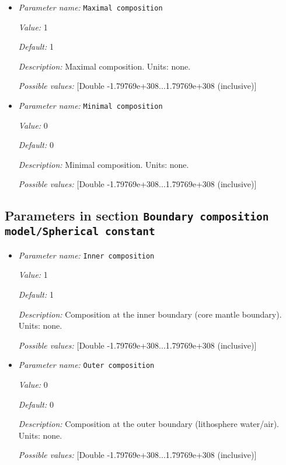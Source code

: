 \begin{itemize}
\item {\it Parameter name:} {\tt Maximal composition}
\label{parameters:Boundary composition model/Initial composition/Maximal composition}


{\it Value:} 1


{\it Default:} 1


{\it Description:} Maximal composition. Units: none.


{\it Possible values:} [Double -1.79769e+308...1.79769e+308 (inclusive)]
\item {\it Parameter name:} {\tt Minimal composition}
\label{parameters:Boundary composition model/Initial composition/Minimal composition}


{\it Value:} 0


{\it Default:} 0


{\it Description:} Minimal composition. Units: none.


{\it Possible values:} [Double -1.79769e+308...1.79769e+308 (inclusive)]
\end{itemize}

\subsection{Parameters in section \tt Boundary composition model/Spherical constant}
\label{parameters:Boundary_20composition_20model/Spherical_20constant}

\begin{itemize}
\item {\it Parameter name:} {\tt Inner composition}
\label{parameters:Boundary composition model/Spherical constant/Inner composition}


{\it Value:} 1


{\it Default:} 1


{\it Description:} Composition at the inner boundary (core mantle boundary). Units: none.


{\it Possible values:} [Double -1.79769e+308...1.79769e+308 (inclusive)]
\item {\it Parameter name:} {\tt Outer composition}
\label{parameters:Boundary composition model/Spherical constant/Outer composition}


{\it Value:} 0


{\it Default:} 0


{\it Description:} Composition at the outer boundary (lithosphere water/air). Units: none.


{\it Possible values:} [Double -1.79769e+308...1.79769e+308 (inclusive)]
\end{itemize}

